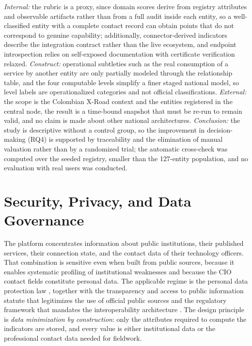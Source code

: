 \documentclass[runningheads]{llncs}
\begin{document}
\emph{Internal:} the rubric is a proxy, since domain scores derive from
registry attributes and observable artifacts rather than from a full audit
inside each entity, so a well-classified entity with a complete contact record
can obtain points that do not correspond to genuine capability; additionally,
connector-derived indicators describe the integration contract rather than the
live ecosystem, and endpoint introspection relies on self-exposed
documentation with certificate verification relaxed. \emph{Construct:}
operational subtleties such as the real consumption of a service by another
entity are only partially modeled through the relationship table, and the four
computable levels simplify a finer staged national model, so level labels are
operationalized categories and not official classifications. \emph{External:}
the scope is the Colombian X-Road context and the entities registered in the
central node, the result is a time-bound snapshot that must be re-run to
remain valid, and no claim is made about other national architectures.
\emph{Conclusion:} the study is descriptive without a control group, so the
improvement in decision-making (RQ4) is supported by traceability and the
elimination of manual valuation rather than by a randomized trial; the
automatic cross-check was computed over the seeded registry, smaller than the
127-entity population, and no evaluation with real users was conducted.

\section{Security, Privacy, and Data Governance}
\label{sec:security}

The platform concentrates information about public institutions, their
published services, their connection state, and the contact data of their
technology officers. That combination is sensitive even when built from public
sources, because it enables systematic profiling of institutional weaknesses
and because the CIO contact fields constitute personal data. The applicable
regime is the personal data protection law \cite{ley1581}, together with the
transparency and access to public information statute that legitimizes the use
of official public sources \cite{ley1712} and the regulatory framework that
mandates the interoperability architecture \cite{decreto1078}. The design
principle is \emph{data minimization by construction}: only the attributes
required to compute the indicators are stored, and every value is either
institutional data or the professional contact data needed for fieldwork.
\end{document}
